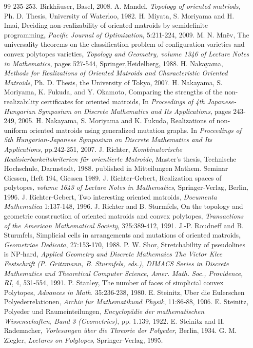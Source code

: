 \documentclass{article}
\begin{document}
\begin{thebibliography}{99}
 235-253. Birkh\"auser, Basel, 2008.
 A. Mandel, {\it Topology of oriented matriods}, Ph. D. Thesis, University of Waterloo, 1982.
 H. Miyata, S. Moriyama and H. Imai,
Deciding non-realizability of oriented matroids by semidefinite programming,
{\it Pacific Journal of  Optimization}, 5:211-224, 2009.
 M. N. Mn\"ev, The universality theorems on the classification problem of
configuration varieties and convex polytopes varieties, {\it Topology and Geometry, volume 1346 of Lecture Notes in Mathematics}, pages 527-544,
Springer,Heidelberg, 1988.
 H. Nakayama, {\it Methods for Realizations of Oriented Matroids and Characteristic Oriented Matroids}, 
Ph. D. Thesis, the University of Tokyo, 2007.
 H. Nakayama, S. Moriyama, K. Fukuda, and Y. Okamoto,
Comparing the strengths of the non-realizability certificates for oriented matroids,
In {\it Proceedings of 4th Japanese-Hungarian Symposium on Discrete Mathematics and Its Applications},
pages 243-249, 2005.
 H. Nakayama, S. Moriyama and K. Fukuda, 
Realizations of non-uniform oriented matroids using generalized mutation graphs. 
In {\it Proceedings of 5th Hungarian-Japanese Symposium on Discrete Mathematics and Its Applications}, pp.242-251, 2007.
 J. Richter, {\it Kombinatorische Realisierbarkeitskriterien f\"ur orientierte
Matroide}, Master's thesis, Technische Hochschule, Darmstadt,
1988. published in Mitteilungen Mathem. Seminar Giessen,
Heft 194, Giessen 1989.
 J. Richter-Gebert, Realization spaces of polytopes, 
{\it volume 1643 of Lecture Notes in Mathematics}, Springer-Verlag, Berlin, 1996.
 J. Richter-Gebert, Two interesting oriented matroids, {\it Documenta Mathematica} 1:137-148, 1996.
 J. Richter and B. Sturmfels, On the topology and geometric construction
of oriented matroids and convex polytopes, {\it Transactions of the American
Mathematical Society}, 325:389-412, 1991.
J.-P. Roudneff and B. Sturmfels, Simplicial cells in arrangements and mutations of oriented matroids,
{\it Geometriae Dedicata}, 27:153-170, 1988.
P. W. Shor, Stretchability of pseudolines is {NP}-hard, {\it Applied Geometry and
Discrete Mathemaics The Victor Klee Festschrift (P. Gritzmann, B. Sturmfels,
eds.), DIMACS Series in Discrete Mathematics and Theoretical Computer
Science, Amer. Math. Soc., Providence, RI}, 4, 531-554, 1991.
P. Stanley, The number of faces of simplicial convex
Polytopes, {\it Advances in Math}. 35:236-238, 1980.
E. Steinitz, Uber die Eulerschen Polyederrelationen, 
{\it Archiv fur Mathematikund Physik}, 11:86-88, 1906.
 E. Steinitz, Polyeder und Raumeinteilungen, {\it Encyclop\"adie der mathematischen Wissenschaften, Band 3 (Geometries)},
pp. 1.139, 1922.
E. Steinitz and H. Rademacher, {\it Vorlesungen \"uber die Threorie der Polyeder}, Berlin, 1934.
 G. M. Ziegler, {\it Lectures on Polytopes}, Springer-Verlag, 1995. 
\end{thebibliography}
\end{document}
